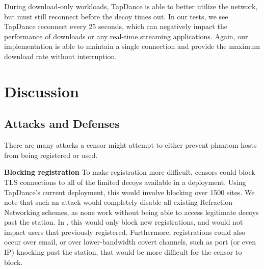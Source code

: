 \documentclass[sigconf]{acmart}
\renewcommand{\paragraph}[1]{\smallskip\noindent\textbf{#1\quad}}
\begin{document}
During download-only workloads, TapDance is able to better utilize the network,
but must still reconnect before the decoy times out. In our tests, we see
TapDance reconnect every 25 seconds, which can negatively impact the performance of
downloads or any real-time streaming applications. Again, our \scheme
implementation is able to maintain a single connection and provide the maximum
download rate without interruption.



\section{Discussion}


\subsection{Attacks and Defenses}
\label{sec:attacks}

There are many attacks a censor might attempt to either prevent phantom hosts from
being registered or used.

\FigUpload
\FigDownload

\paragraph{Blocking registration}
To make registration more difficult, censors could block TLS connections to all of the
limited decoys available in a deployment. Using TapDance's current deployment,
this would involve blocking over 1500 sites. We note that such an attack would
completely disable all existing Refraction Networking schemes, as none work
without being able to access legitimate decoys past the station. In \scheme,
this would only block new registrations, and would not impact users that
previously registered. Furthermore, registrations could also occur over email,
or over lower-bandwidth covert channels, such as port (or even IP) knocking past
the station, that would be more difficult for the censor to block.
\end{document}
